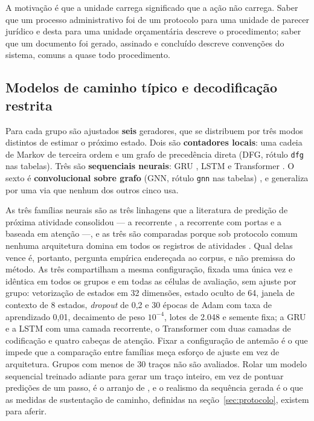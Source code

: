 A motivação é que a unidade carrega significado que a ação não carrega. Saber que um processo
administrativo foi de um protocolo para uma unidade de parecer jurídico e desta para uma unidade
orçamentária descreve o procedimento; saber que um documento foi gerado, assinado e concluído
descreve convenções do sistema, comuns a quase todo procedimento.

\subsection{Modelos de caminho típico e decodificação restrita}\label{sec:caminhos}

Para cada grupo são ajustados \textbf{seis} geradores, que se distribuem por três modos distintos de
estimar o próximo estado. Dois são \textbf{contadores locais}: uma cadeia de Markov de terceira
ordem e um grafo de precedência direta (DFG, rótulo \texttt{dfg} nas tabelas). Três são
\textbf{sequenciais neurais}: GRU \cite{cho2014gru}, LSTM \cite{hochreiter1997lstm} e Transformer
\cite{vaswani2017attention}. O sexto é \textbf{convolucional sobre grafo} (GNN, rótulo \texttt{gnn}
nas tabelas) \cite{kipf2017gcn}, e generaliza por uma via que nenhum dos outros cinco usa.

As três famílias neurais são as três linhagens que a literatura de predição de próxima atividade
consolidou --- a recorrente \cite{tax2017lstm}, a recorrente com portas e a baseada em atenção
\cite{bukhsh2021processtransformer} ---, e as três são comparadas porque
sob protocolo comum nenhuma arquitetura domina em todos os registros de atividades
\cite{ramamaneiro2023dlppm}. Qual delas vence é, portanto, pergunta empírica endereçada ao corpus, e
não premissa do método. As três compartilham a mesma configuração, fixada uma única vez e idêntica
em todos os grupos e em todas as células de avaliação, sem ajuste por grupo: vetorização de estados
em 32 dimensões, estado oculto de 64, janela de contexto de 8 estados, \emph{dropout} de 0,2 e 30
épocas de Adam com taxa de aprendizado 0,01, decaimento de peso $10^{-4}$, lotes de 2.048 e semente
fixa; a GRU e a LSTM com uma camada recorrente, o Transformer com duas camadas de codificação e
quatro cabeças de atenção. Fixar a configuração de antemão é o que impede que a comparação entre
famílias meça esforço de ajuste em vez de arquitetura. Grupos com menos de 30 traços não são
avaliados. Rolar um
modelo sequencial treinado adiante para gerar um traço inteiro, em vez de pontuar predições de um
passo, é o arranjo de , e o realismo da sequência gerada é o que as
medidas de sustentação de caminho, definidas na seção~\ref{sec:protocolo}, existem para aferir.

